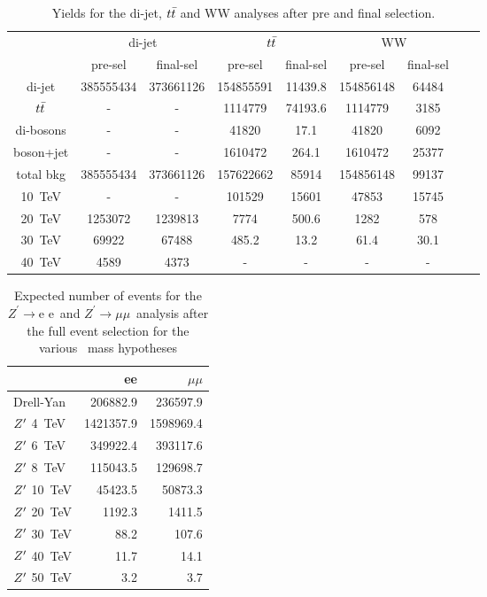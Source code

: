 \documentclass{cernrep}
\newcommand*{\Zpee}{\ensuremath{Z^{\prime}\rightarrow \text{e e}}}
\newcommand*{\Zpmumu}{\ensuremath{Z^{\prime}\rightarrow \mu\mu}}
\begin{document}
\begin{table}[htbp]
   \centering
\begin{tabular}{|c|c|c|c|c|c|c|c|c|}
  \hline
  & \multicolumn{2}{c|}{di-jet}  & \multicolumn{2}{c|}{$t\bar{t}$} & \multicolumn{2}{c|}{WW} \\
  \cline{2-7}

 & pre-sel & final-sel  & pre-sel & final-sel & pre-sel & final-sel\\
  \hline
  di-jet & 385555434 &  373661126 &  154855591 & 11439.8&  154856148 & 64484\\
  $t\bar{t}$ & - & - & 1114779 & 74193.6 &  1114779 & 3185\\
  di-bosons & - & - &  41820 &  17.1 &  41820 & 6092\\
  boson+jet & - & - & 1610472 & 264.1&  1610472 & 25377\\
  \hline
  total bkg  &  385555434& 373661126& 157622662 & 85914 & 154856148 & 99137\\
  \hline
  10~TeV &  - & - &  101529 & 15601 &  47853 & 15745\\
  20~TeV &   1253072 &  1239813& 7774 & 500.6 & 1282 & 578\\
  30~TeV &  69922 &  67488 & 485.2 & 13.2 &  61.4 & 30.1 \\
  40~TeV &  4589 &  4373 & - & - & - & -\\
  \hline
\end{tabular}
  \caption{Yields for the di-jet, $t\bar{t}$ and WW analyses after pre and final selection.}
  \label{tab:hadronicresonances:yields}
\end{table}


\begin{table}[htbp]
   \centering
\begin{tabular}{l|r|r}
 & ee & $\mu\mu$  \\
  \hline
  Drell-Yan & 206882.9 & 236597.9 \\
  \hline
  $Z^{\prime}$ 4~TeV & 1421357.9    & 1598969.4 \\
  $Z^{\prime}$ 6~TeV & 349922.4  & 393117.6\\
  $Z^{\prime}$ 8~TeV &   115043.5 & 129698.7 \\
  $Z^{\prime}$ 10~TeV &  45423.5 & 50873.3 \\
  $Z^{\prime}$ 20~TeV &  1192.3 & 1411.5\\
  $Z^{\prime}$ 30~TeV &  88.2 & 107.6\\
  $Z^{\prime}$ 40~TeV &  11.7 & 14.1 \\
  $Z^{\prime}$ 50~TeV &  3.2 & 3.7\\
\end{tabular}
  \caption{Expected number of events for the \Zpee\ and \Zpmumu\ analysis after the full event selection for the various \Zp\ mass hypotheses}
  \label{tab:leptonicresonances:yieldsll}
\end{table}
\end{document}
